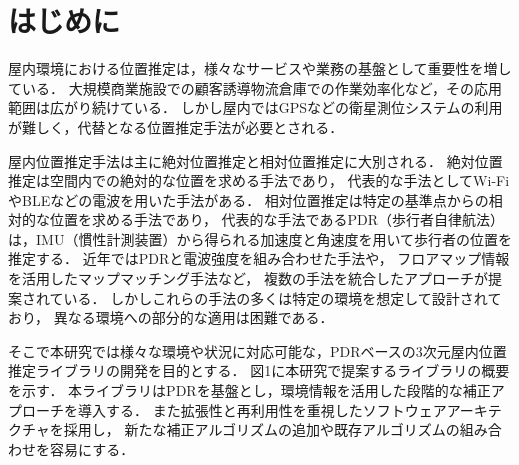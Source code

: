 \documentclass[a4paper, 10pt, twocolumn]{jarticle}
\begin{document}


\section{はじめに}


屋内環境における位置推定は，様々なサービスや業務の基盤として重要性を増している．
大規模商業施設での顧客誘導物流倉庫での作業効率化など，その応用範囲は広がり続けている．
しかし屋内ではGPSなどの衛星測位システムの利用が難しく，代替となる位置推定手法が必要とされる．

屋内位置推定手法は主に絶対位置推定と相対位置推定に大別される．
絶対位置推定は空間内での絶対的な位置を求める手法であり，
代表的な手法としてWi-FiやBLEなどの電波を用いた手法がある．
相対位置推定は特定の基準点からの相対的な位置を求める手法であり，
代表的な手法であるPDR（歩行者自律航法）は，IMU（慣性計測装置）から得られる加速度と角速度を用いて歩行者の位置を推定する．
近年ではPDRと電波強度を組み合わせた手法\cite{pdr-rss-fusion}や，
フロアマップ情報を活用したマップマッチング手法\cite{pdr-map}など，
複数の手法を統合したアプローチが提案されている．
しかしこれらの手法の多くは特定の環境を想定して設計されており，
異なる環境への部分的な適用は困難である．

そこで本研究では様々な環境や状況に対応可能な，PDRベースの3次元屋内位置推定ライブラリの開発を目的とする．
図1に本研究で提案するライブラリの概要を示す．
本ライブラリはPDRを基盤とし，環境情報を活用した段階的な補正アプローチを導入する．
また拡張性と再利用性を重視したソフトウェアアーキテクチャを採用し，
新たな補正アルゴリズムの追加や既存アルゴリズムの組み合わせを容易にする．
\end{document}
